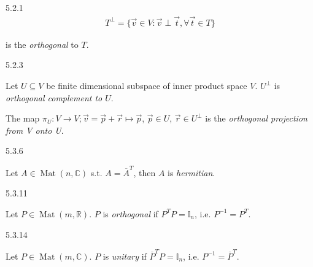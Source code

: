 \documentclass[10pt]{article} %
\DeclareMathOperator{\Mat}{Mat}
\begin{document}
\begin{multicols}{3}
\begin{definition}{5.2.1}{}
        \begin{align*}
            T^{\perp} = \{ \vec{v} \in V: \vec{v} \perp \vec{t}, \forall \vec{t} \in T \}
        \end{align*}

    is the \emph{orthogonal} to $T$.

\end{definition}

\begin{definition}{5.2.3}{}

    Let $U \subseteq V$ be finite dimensional subspace of inner product space $V$. $U^{\perp}$ is \emph{orthogonal complement to $U$}.

    The map $\pi_U: V \to V; \vec{v} = \vec{p} + \vec{r} \mapsto \vec{p}$, $\vec{p} \in U$, $\vec{r} \in U^{\perp}$ is the \emph{orthogonal projection from V onto U}.

\end{definition}

\begin{definition}{5.3.6}{}

    Let $A \in \Mat(n,\mathbb{C})$ s.t. $A = \overline{A}^T$, then $A$ is \emph{hermitian}.

\end{definition}

\begin{definition}{5.3.11}{}

    Let $P \in \Mat(m,\mathbb{R})$. $P$ is \emph{orthogonal} if $P^TP = \mathbb{I}_n$, i.e. $P^{-1} = P^T$.

\end{definition}

\begin{definition}{5.3.14}{}

    Let $P \in \Mat(m,\mathbb{C})$. $P$ is \emph{unitary} if $\overline{P}^TP = \mathbb{I}_n$, i.e. $P^{-1} = \overline{P}^T$.

\end{definition}

\end{multicols}
\end{document}
